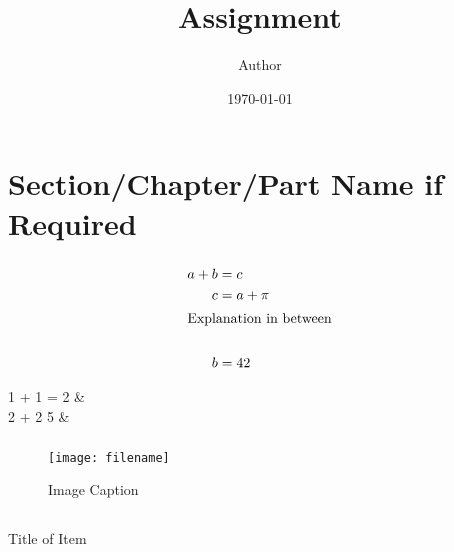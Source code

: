 \documentclass[12pt]{article}
\title{Assignment}
\author{Author}
\date{\today}
\newcommand{\exercise}{\subsection{}\setcounter{subsubsection}{0}}
\newcommand{\multipartexercise}{\addtocounter{subsection}{1}\setcounter{subsubsection}{0}}
\newcommand{\exercisepart}{\subsubsection{}}
\begin{document}
\maketitle

\section*{Section/Chapter/Part Name if Required}
\multipartexercise \exercisepart
\lipsum[1-1] %

\begin{align*}
    a + b &= c \\
    c &= a + \pi \\
    \intertext{Explanation in between} \\
    b &= 42
\end{align*}

\begin{description}[labelwidth=0pt]
\item[]
\begin{DispWithArrows*}[format=cr,fleqn,mathindent=0pt]
    1 + 1 = 2 &
     \\
    2 + 2  5 &
\end{DispWithArrows*}
\end{description}

\exercisepart
\lipsum[2-2] %

\begin{figure}[h]
    \centering
    \texttt{[image: filename]}
    \caption{Image Caption}
    \label{imagereference}
\end{figure}

\multipartexercise \exercisepart
\lipsum[3-3] %

\exercise
\begin{itemize}
    \begin{minipage}{\textwidth} %
    \item Title of Item

    \lipsum[5-5] %
    \end{minipage}
\end{itemize}
\end{document}
